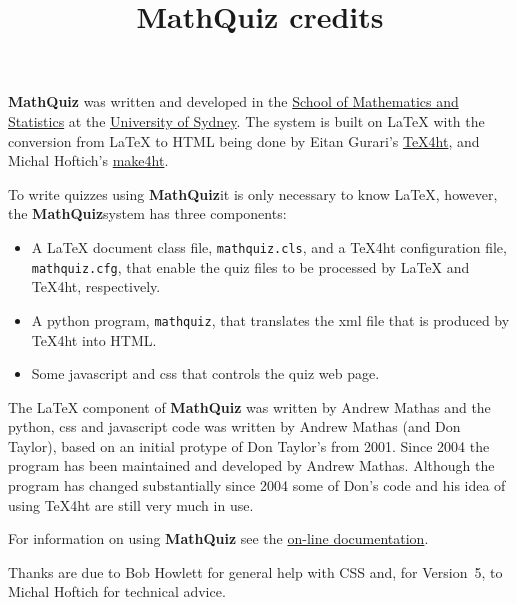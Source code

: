 \documentclass{mathquiz}
\title{MathQuiz credits}
\newcommand{\MathQuiz}{\textbf{MathQuiz}}
\begin{document}
\begin{discussion}[Credits]
    \MathQuiz{} was written and developed in the
    \href{http://www.maths.usyd.edu.au/}{School of Mathematics and
    Statistics} at the \href{http://www.usyd.edu.au/}{University of
    Sydney}.  The system is built on \LaTeX{} with the conversion from
    \LaTeX{} to HTML being done by Eitan Gurari's
    \href{http://www.cis.ohio-state.edu/~gurari/TeX4ht/mn.html}{TeX4ht},
    and Michal Hoftich's
    \href{https://github.com/michal-h21/make4ht}{make4ht}.

    To write quizzes using \MathQuiz it is only necessary to know
    \LaTeX, however, the \MathQuiz system has three components:
    \begin{itemize}
      \item A \LaTeX{} document class file, \texttt{mathquiz.cls}, and
      a \TeX 4ht configuration file, \texttt{mathquiz.cfg}, that enable the
      quiz files to be processed by \LaTeX{} and \TeX 4ht, respectively.
      \item A python program, \texttt{mathquiz}, that translates the xml
      file that is produced by \TeX 4ht into  HTML.
      \item Some javascript and css that controls the quiz web page.
    \end{itemize}

   The \LaTeX{} component of \MathQuiz{} was written by Andrew Mathas
   and the python, css and javascript code was written by Andrew Mathas
   (and Don Taylor), based on an initial protype of Don Taylor's from
   2001.  Since 2004 the program has been maintained and developed by
   Andrew Mathas. Although the program has changed substantially since
   2004 some of Don's code and his idea of using \TeX 4ht are still very
   much in use.

   For information on using \MathQuiz{} see the
   \href{http://www.maths.usyd.edu.au/u/MOW/MathQuiz/doc/mathquiz-manual.html}{on-line documentation}.

   Thanks are due to Bob Howlett for general help with CSS and, for
   Version~5, to  Michal Hoftich for technical advice.
\end{discussion}
\end{document}
